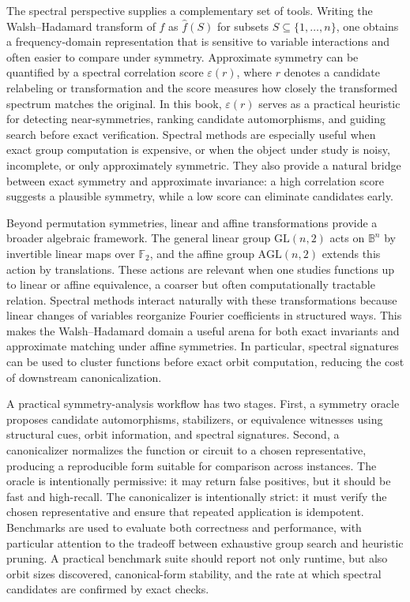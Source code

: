 The spectral perspective supplies a complementary set of tools. Writing the Walsh--Hadamard transform of $f$ as $\widehat{f}(S)$ for subsets $S \subseteq \{1,\dots,n\}$, one obtains a frequency-domain representation that is sensitive to variable interactions and often easier to compare under symmetry. Approximate symmetry can be quantified by a spectral correlation score $\varepsilon(r)$, where $r$ denotes a candidate relabeling or transformation and the score measures how closely the transformed spectrum matches the original. In this book, $\varepsilon(r)$ serves as a practical heuristic for detecting near-symmetries, ranking candidate automorphisms, and guiding search before exact verification. Spectral methods are especially useful when exact group computation is expensive, or when the object under study is noisy, incomplete, or only approximately symmetric. They also provide a natural bridge between exact symmetry and approximate invariance: a high correlation score suggests a plausible symmetry, while a low score can eliminate candidates early.

Beyond permutation symmetries, linear and affine transformations provide a broader algebraic framework. The general linear group $\mathrm{GL}(n,2)$ acts on $\mathbb{B}^n$ by invertible linear maps over $\mathbb{F}_2$, and the affine group $\mathrm{AGL}(n,2)$ extends this action by translations. These actions are relevant when one studies functions up to linear or affine equivalence, a coarser but often computationally tractable relation. Spectral methods interact naturally with these transformations because linear changes of variables reorganize Fourier coefficients in structured ways. This makes the Walsh--Hadamard domain a useful arena for both exact invariants and approximate matching under affine symmetries. In particular, spectral signatures can be used to cluster functions before exact orbit computation, reducing the cost of downstream canonicalization.

A practical symmetry-analysis workflow has two stages. First, a symmetry oracle proposes candidate automorphisms, stabilizers, or equivalence witnesses using structural cues, orbit information, and spectral signatures. Second, a canonicalizer normalizes the function or circuit to a chosen representative, producing a reproducible form suitable for comparison across instances. The oracle is intentionally permissive: it may return false positives, but it should be fast and high-recall. The canonicalizer is intentionally strict: it must verify the chosen representative and ensure that repeated application is idempotent. Benchmarks are used to evaluate both correctness and performance, with particular attention to the tradeoff between exhaustive group search and heuristic pruning. A practical benchmark suite should report not only runtime, but also orbit sizes discovered, canonical-form stability, and the rate at which spectral candidates are confirmed by exact checks.

